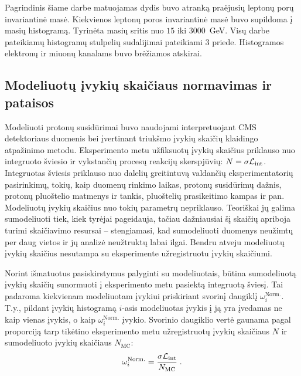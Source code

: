 \documentclass[a4paper, 12pt, oneside]{article}
\newcommand{\Lumi}{{\cal L}_\mathrm{int}}
\newlength\q
\begin{document}
Pagrindinis šiame darbe matuojamas dydis buvo atranką praėjusių leptonų porų invariantinė masė.
Kiekvienos leptonų poros invariantinė masė buvo supildoma į masių histogramą.
Tyrinėta masių sritis nuo $15$ iki $3000$~GeV.
Visų darbe pateikiamų histogramų stulpelių sudalijimai pateikiami 3 priede.
Histogramos elektronų ir miuonų kanalams buvo brėžiamos atskirai.

\subsection{Modeliuotų įvykių skaičiaus normavimas ir pataisos}
Modeliuoti protonų susidūrimai buvo naudojami interpretuojant CMS detektoriaus duomenis bei įvertinant triukšmo įvykių
skaičių klaidingo atpažinimo metodu.
Eksperimento metu užfiksuotų įvykių skaičius priklauso nuo integruoto šviesio ir vykstančių procesų reakcijų skerspjūvių:
$N = \sigma\Lumi$.
Integruotas šviesis priklauso nuo dalelių greitintuvą valdančių eksperimentatorių pasirinkimų, tokių, kaip duomenų rinkimo laikas,
protonų susidūrimų dažnis, protonų pluoštelio matmenys ir tankis, pluoštelių prasikeitimo kampas ir pan.
Modeliuotų įvykių skaičius nuo tokių parametrų nepriklauso.
Teoriškai jų galima sumodeliuoti tiek, kiek tyrėjai pageidauja, tačiau dažniausiai šį skaičių apriboja turimi skaičiavimo
resursai -- stengiamasi, kad sumodeliuoti duomenys neužimtų per daug vietos ir jų analizė neužtruktų labai ilgai.
Bendru atveju modeliuotų įvykių skaičius nesutampa su eksperimente užregistruotu įvykių skaičiumi.

Norint išmatuotus pasiskirstymus palyginti su modeliuotais, būtina sumodeliuotą įvykių skaičių sunormuoti į eksperimento
metu pasiektą integruotą šviesį.
Tai padaroma kiekvienam modeliuotam įvykiui priskiriant svorinį daugiklį $\omega_{i}^{\mathrm{Norm.}}$.
T.y., pildant įvykių histogramą $i$-asis modeliuotas įvykis į ją yra įvedamas ne kaip vienas įvykis, o kaip
$\omega_{i}^{\mathrm{Norm.}}$ įvykio.
Svorinio daugiklio vertė gaunama pagal proporciją tarp tikėtino eksperimento metu užregistruotų įvykių skaičiaus $N$ ir
sumodeliuoto įvykių skaičiaus $N_{\mathrm{MC}}$:
\begin{equation}
	\label{eq:LOweight}
	\omega_{i}^{\mathrm{Norm.}} = \frac{ \sigma\Lumi }{ N_{\mathrm{MC}} } \; .
\end{equation}
\end{document}
